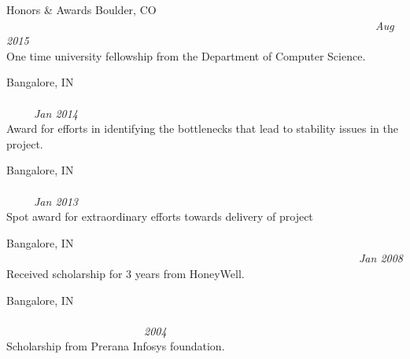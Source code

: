 \begin{category}{Honors \& Awards}
 Boulder, CO
~~~~~~~~~~~~~~~~~~~~~~~~~~~~~~~~~~~~~~~~~~~~~~~~~~~~~~~~~~~~~~~~~~~\textit{Aug 2015}\\
One time university fellowship from the Department of Computer Science.

 Bangalore, IN ~~~~~~~~~~~~~~~~~~~~~~~~~~~~~~~~~~~~~~~~~~~~~~~~~~~~~~~~~~~~~~~~~~~~~~~~~~~~~\textit{Jan 2014}\\
Award for efforts in identifying the bottlenecks that lead to stability issues in the project.

 Bangalore, IN ~~~~~~~~~~~~~~~~~~~~~~~~~~~~~~~~~~~~~~~~~~~~~~~~~~~~~~~~~~~~~~~~~~~~~~~~~~~~~\textit{Jan 2013}\\
Spot award for extra­ordinary efforts towards delivery of project

 Bangalore, IN ~~~~~~~~~~~~~~~~~~~~~~~~~~~~~~~~~~~~~~~~~~~~~~~~~~~~~~~~~~~~~~~~\textit{Jan 2008}\\
Received scholarship for 3 years from HoneyWell.

 Bangalore, IN ~~~~~~~~~~~~~~~~~~~~~~~~~~~~~~~~~~~~~~~~~~~~~~~~~~~~~~~~~~~~~~~~~~~~~~~~~~~~~~~~~~~~~~~~~~~~~~~~~\textit{2004}\\
Scholarship from Prerana Infosys foundation.

\end{category}
